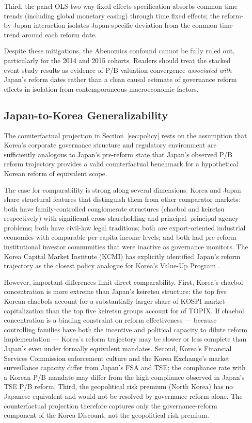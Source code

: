 \documentclass[12pt]{article}
\begin{document}
Third, the panel OLS two-way fixed effects specification absorbs common time trends
(including global monetary easing) through time fixed effects; the reform-by-Japan interaction
isolates Japan-specific deviation from the common time trend around each reform date.

Despite these mitigations, the Abenomics confound cannot be fully ruled out, particularly
for the 2014 and 2015 cohorts. Readers should treat the stacked event study results as
evidence of P/B valuation convergence \textit{associated with} Japan's reform dates rather
than a clean causal estimate of governance reform effects in isolation from contemporaneous
macroeconomic factors.

\subsection{Japan-to-Korea Generalizability}

The counterfactual projection in Section~\ref{sec:policy} rests on the assumption that Korea's
corporate governance structure and regulatory environment are sufficiently analogous to
Japan's pre-reform state that Japan's observed P/B reform trajectory provides a valid
counterfactual benchmark for a hypothetical Korean reform of equivalent scope.

The case for comparability is strong along several dimensions. Korea and Japan share
structural features that distinguish them from other comparator markets: both have
family-controlled conglomerate structures (chaebol and keiretsu respectively) with significant
cross-shareholding and principal--principal agency problems; both have civil-law legal
traditions; both are export-oriented industrial economies with comparable per-capita income
levels; and both had pre-reform institutional investor communities that were inactive as
governance monitors. The Korea Capital Market Institute (KCMI) has explicitly identified
Japan's reform trajectory as the closest policy analogue for Korea's Value-Up Program
\citep{kcmi2023}.

However, important differences limit direct comparability. First, Korea's chaebol
concentration is more extreme than Japan's keiretsu structure: the top five Korean chaebols
account for a substantially larger share of KOSPI market capitalization than the top five
keiretsu groups account for of TOPIX. If chaebol concentration is a binding constraint
on reform effectiveness --- because controlling families have both the incentive and political
capacity to dilute reform implementation --- Korea's reform trajectory may be slower or less
complete than Japan's even under formally equivalent mandates. Second, Korea's Financial
Services Commission enforcement culture and the Korea Exchange's market surveillance
capacity differ from Japan's FSA and TSE; the compliance rate with a Korean P/B mandate
may differ from the high compliance observed in Japan's TSE P/B reform. Third, the
geopolitical risk premium (North Korea) has no Japanese equivalent and would not be resolved
by governance reform alone. The counterfactual projection therefore captures only the
governance-reform component of the Korea Discount, not the geopolitical risk premium.
\end{document}
